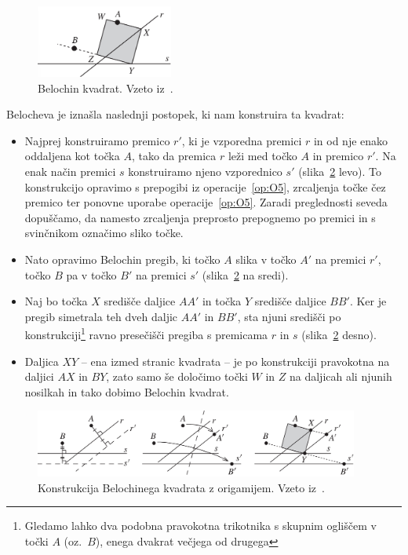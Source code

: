 \begin{figure}[h]
    \centering
    \includegraphics[width=0.4\textwidth]{images/kubična enačba/beloch_kvadrat.png}
    \caption[Belochin kvadrat]{Belochin kvadrat. Vzeto iz~\cite[str.\ 309]{hull2011}.}
    \label{fig:beloch_kvadrat}
\end{figure}

Belocheva je iznašla naslednji postopek, ki nam konstruira ta kvadrat:
\begin{itemize}
    \item Najprej konstruiramo premico $r'$, ki je vzporedna premici $r$ in od nje enako oddaljena kot točka $A$, tako da premica $r$ leži med točko $A$ in premico $r'$. Na enak način premici $s$ konstruiramo njeno vzporednico $s'$ (slika~\ref{fig:beloch_kvadrat_konstrukcija} levo). To konstrukcijo opravimo s prepogibi iz operacije~\ref{op:O5}, zrcaljenja točke čez premico ter ponovne uporabe operacije~\ref{op:O5}. Zaradi preglednosti seveda dopuščamo, da namesto zrcaljenja preprosto prepognemo po premici in s svinčnikom označimo sliko točke.
    \item Nato opravimo Belochin pregib, ki točko $A$ slika v točko $A'$ na premici $r'$, točko $B$ pa v točko $B'$ na premici $s'$ (slika~\ref{fig:beloch_kvadrat_konstrukcija} na sredi).
    \item Naj bo točka $X$ središče daljice $AA'$ in točka $Y$ središče daljice $BB'$. Ker je pregib simetrala teh dveh daljic $AA'$ in $BB'$, sta njuni središči po konstrukciji\footnote{Gledamo lahko dva podobna pravokotna trikotnika s skupnim ogliščem v točki $A$ (oz.\ $B$), enega dvakrat večjega od drugega} ravno presečišči pregiba s premicama $r$ in $s$ (slika~\ref{fig:beloch_kvadrat_konstrukcija} desno).
    \item Daljica $XY$ -- ena izmed stranic kvadrata -- je po konstrukciji pravokotna na daljici $AX$ in $BY$, zato samo še določimo točki $W$ in $Z$ na daljicah ali njunih nosilkah in tako dobimo Belochin kvadrat.
\end{itemize}

\begin{figure}[h]
    \centering
    \includegraphics[width=0.95\textwidth]{images/kubična enačba/beloch_kvadrat_konstrukcija.png}
    \caption[Konstrukcija Belochinega kvadrata]{Konstrukcija Belochinega kvadrata z origamijem. Vzeto iz~\cite[str.\ 310]{hull2011}.}
    \label{fig:beloch_kvadrat_konstrukcija}
\end{figure}

